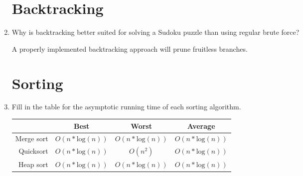 \documentclass[11pt]{article}
\newenvironment{answer}{\large\lstset{basicstyle=\tiny\ttfamily}\color{white}}{}
\newenvironment{answer}{\large\lstset{basicstyle=\large\ttfamily}\color{red}}{}
\begin{document}
\begin{enumerate}
	
	
	
	\section*{Backtracking}
	
	\item Why is backtracking better suited for solving a Sudoku puzzle than
	      using regular brute force?
	
	\begin{answer}
	A properly implemented backtracking approach will prune fruitless branches. 
	\end{answer}

\newpage
\section*{Sorting}

\item Fill in the table for the asymptotic running time of each sorting
      algorithm.
      \begin{center}
      \begin{tabular}{|r|c|c|c|}
        \hline
        ~ & Best & Worst & Average \\\hline
        Merge sort &
            \begin{answer}$O(n*\textrm{log}(n))$\end{answer} &
            \begin{answer}$O(n*\textrm{log}(n))$\end{answer} &
            \begin{answer}$O(n*\textrm{log}(n))$\end{answer} \\\hline
        Quicksort &
            \begin{answer}$O(n*\textrm{log}(n))$\end{answer} &
            \begin{answer}$O(n^2)$\end{answer} &
            \begin{answer}$O(n*\textrm{log}(n))$\end{answer} \\\hline
        Heap sort &
            \begin{answer}$O(n*\textrm{log}(n))$\end{answer} &
            \begin{answer}$O(n*\textrm{log}(n))$\end{answer} &
            \begin{answer}$O(n*\textrm{log}(n))$\end{answer} \\\hline
      \end{tabular}
      \end{center}


\end{enumerate}
\end{document}

